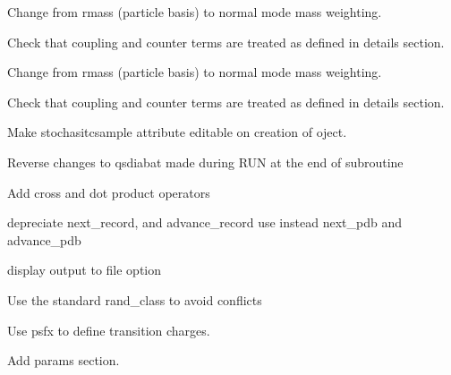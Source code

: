 
\begin{DoxyRefList}
\item[\label{todo__todo000001}%
\hypertarget{todo__todo000001}{}%
Type \hyperlink{classcaldeiraleggett__class}{caldeiraleggett\+\_\+class} ]Change from rmass (particle basis) to normal mode mass weighting. 

Check that coupling and counter terms are treated as defined in details section.  
\item[\label{todo__todo000002}%
\hypertarget{todo__todo000002}{}%
Type \hyperlink{classdmblcoupling__class}{dmblcoupling\+\_\+class} ]Change from rmass (particle basis) to normal mode mass weighting. 

Check that coupling and counter terms are treated as defined in details section.  
\item[\label{todo__todo000003}%
\hypertarget{todo__todo000003}{}%
Type \hyperlink{classharmonicbath__class}{harmonicbath\+\_\+class} ]Make stochasitcsample attribute editable on creation of oject.  
\item[\label{todo__todo000004}%
\hypertarget{todo__todo000004}{}%
Type \hyperlink{classldm__class}{ldm\+\_\+class} ]Reverse changes to qsdiabat made during R\+U\+N at the end of subroutine  
\item[\label{todo__todo000014}%
\hypertarget{todo__todo000014}{}%
Type \hyperlink{classmath}{math} ]
\begin{DoxyItemize}
\item Add cross and dot product operators  
\end{DoxyItemize}
\item[\label{todo__todo000005}%
\hypertarget{todo__todo000005}{}%
Type \hyperlink{classmolreader}{molreader} ]depreciate next\+\_\+record, and advance\+\_\+record use instead next\+\_\+pdb and advance\+\_\+pdb  
\item[\label{todo__todo000006}%
\hypertarget{todo__todo000006}{}%
Type \hyperlink{classpldm__class}{pldm\+\_\+class} ]
\begin{DoxyItemize}
\item display output to file option  
\end{DoxyItemize}
\item[\label{todo__todo000007}%
\hypertarget{todo__todo000007}{}%
Subprogram \hyperlink{praxis_8f_af54b43bfee4d4da9d35c12de385dd6cd}{ran0} (idum)]Use the standard rand\+\_\+class to avoid conflicts  
\item[\label{todo__todo000009}%
\hypertarget{todo__todo000009}{}%
Subprogram \hyperlink{classspectrometer__class_af1fc802879075c7e5e42ef4baac69445}{spectrometer\+\_\+class\+:\+:get\+\_\+abpdbspectrum} (this, qs, file, pdb, psf, psfx, atm\+\_\+select, dipole\+\_\+to, dipole\+\_\+from, dipole\+\_\+center)]
\begin{DoxyItemize}
\item Use psfx to define transition charges.
\item Add params section. 
\end{DoxyItemize}



\end{DoxyRefList}
